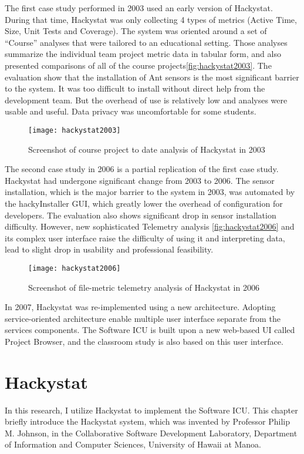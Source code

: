 The first case study performed in 2003 used an early version of Hackystat\cite{csdl2-03-13}. During that time, Hackystat was only collecting 4 types of metrics (Active Time, Size, Unit Tests and Coverage). The system was oriented around a set of ``Course'' analyses that were tailored to an educational setting. Those analyses summarize the individual team project metric data in tabular form, and also presented comparisons of all of the course projects\autoref{fig:hackystat2003}. The evaluation show that the installation of Ant sensors is the most significant barrier to the system. It was too difficult to install without direct help from the development team. But the overhead of use is relatively low and analyses were usable and useful. Data privacy was uncomfortable for some students.

\begin{figure}[htbp]
   \centering
   \texttt{[image: hackystat2003]} 
   \caption{Screenshot of course project to date analysis of Hackystat in 2003}
   \label{fig:hackystat2003}
\end{figure}

The second case study in 2006 is a partial replication of the first case study\cite{csdl2-07-02}. Hackystat had undergone significant change from 2003 to 2006. The sensor installation, which is the major barrier to the system in 2003, was automated by the hackyInstaller GUI, which greatly lower the overhead of configuration for developers. The evaluation also shows significant drop in sensor installation difficulty. However, new sophisticated Telemetry analysis \autoref{fig:hackystat2006} and its complex user interface raise the difficulty of using it and interpreting data, lead to slight drop in usability and professional feasibility.

\begin{figure}[htbp]
   \centering
   \texttt{[image: hackystat2006]} 
   \caption{Screenshot of file-metric telemetry analysis of Hackystat in 2006}
   \label{fig:hackystat2006}
\end{figure}

In 2007, Hackystat was re-implemented using a new architecture. Adopting service-oriented architecture enable  multiple user interface separate from the services components. The Software ICU is built upon a new web-based UI called Project Browser, and the classroom study is also based on this user interface.


\chapter{Hackystat}
In this research, I utilize Hackystat to implement the Software ICU. This chapter briefly introduce the Hackystat system, which was invented by Professor Philip M. Johnson, in the Collaborative Software Development Laboratory, Department of Information and Computer Sciences, University of Hawaii at Manoa. 
 
